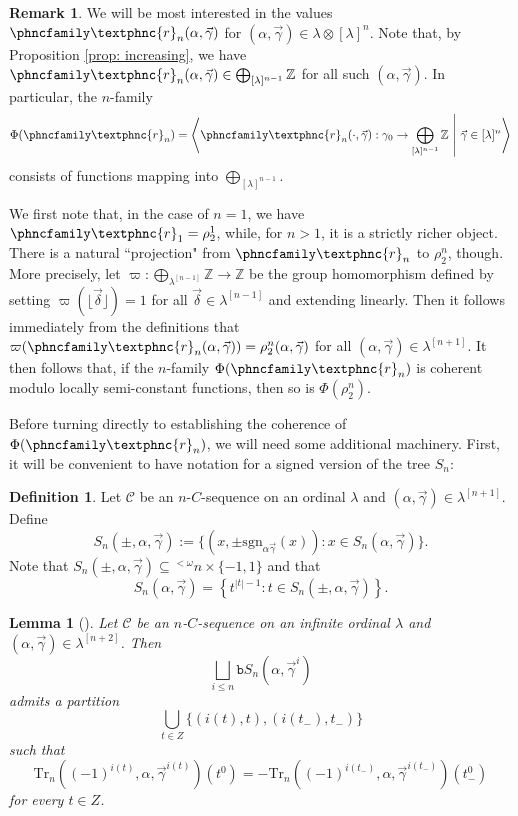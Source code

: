 \documentclass{amsart}
\numberwithin{theorem}{section}
\newtheorem{lemma}[theorem]{Lemma}
\theoremstyle{definition}
\newtheorem{definition}[theorem]{Definition}
\newtheorem{remark}[theorem]{Remark}
\renewcommand{\subset}{\subseteq}
\newcommand{\bb}{\mathbb}
\newcommand{\ra}{\rightarrow}
\newcommand{\Z}{\mathbb{Z}}
\newcommand{\w}{\omega}
\newcommand{\C}{\mathcal{C}}
\newcommand{\Tr}{\mathrm{Tr}}
\newcommand{\bS}{\mathtt{b}S}
\newcommand{\resh}{{\phncfamily\textphnc{r}}}
\newcommand{\sgn}{\mathrm{sgn}}
\begin{document}
\begin{remark}
  We will be most interested in the values $\resh_n(\alpha,\vec{\gamma})$ for 
  $(\alpha,\vec{\gamma}) \in \lambda \otimes [\lambda]^n$. Note that, by Proposition 
  \ref{prop: increasing}, we have $\resh_n(\alpha,\vec{\gamma}) \in \bigoplus_{[\lambda]^{n-1}} 
  \bb{Z}$ for all such $(\alpha,\vec{\gamma})$. In particular, the $n$-family
  \[
    \Phi(\resh_n) = \left\langle \resh_n(\cdot,\vec{\gamma}):\gamma_0 \ra 
    \bigoplus_{[\lambda]^{n-1}} \bb{Z} \ \middle| \ \vec{\gamma} \in [\lambda]^n
    \right\rangle
  \]
  consists of functions mapping into $\bigoplus_{[\lambda]^{n-1}}$.
\end{remark}

We first note that, in the case of $n = 1$, we have $\resh_1 = \rho_2^1$, while, for 
$n > 1$, it is a strictly richer object. There is a natural ``projection" from 
$\resh_n$ to $\rho_2^n$, though. More precisely, let 
$\varpi: \bigoplus_{\lambda^{[n-1]}} \Z \ra \Z$ be the group homomorphism defined by setting 
$\varpi(\lfloor \vec{\delta} \rfloor) = 1$
for all $\vec{\delta} \in \lambda^{[n-1]}$ and extending linearly. Then it follows immediately 
from the definitions that $\varpi(\resh_n(\alpha,\vec{\gamma})) = \rho_2^n(\alpha,\vec{\gamma})$ 
for all $(\alpha,\vec{\gamma}) \in \lambda^{[n+1]}$. It then follows that, if the $n$-family 
$\Phi(\resh_n)$ is coherent modulo locally semi-constant functions, then so is $\Phi(\rho_2^n)$.

Before turning directly to establishing the coherence of $\Phi(\resh_n)$, we will need some additional 
machinery. First, it will be convenient to have notation for a signed version of the tree $S_n$:
\begin{definition}\label{signS}
Let $\C$ be an $n$-$C$-sequence on an ordinal $\lambda$ and $(\alpha,\vec{\gamma}) \in 
\lambda^{[n+1]}$. Define
\[
S_n(\pm,\alpha,\vec\gamma):=\{(x,\pm\sgn_{\alpha\vec\gamma}(x)):x\in S_n(\alpha,\vec\gamma)\}.
\]
Note that $S_n(\pm,\alpha,\vec\gamma)\subset {}^{<\w}n \times \{-1,1\}$ and that
\[
S_n(\alpha,\vec\gamma)=\left\{t^{|t|-1}:t\in S_n(\pm,\alpha,\vec\gamma)\right\}.
\]
\end{definition}



\begin{lemma}[{\cite[Lemma 7.12]{bergfalk2024introductionhigherwalks}}]\label{7.12}
Let $\C$ be an $n$-$C$-sequence on an infinite ordinal $\lambda$ and $(\alpha,\vec{\gamma}) \in 
\lambda^{[n+2]}$. Then
\[
\bigsqcup_{i\le n}\bS_n(\alpha,\vec\gamma^i)
\]
admits a partition
\[
\bigcup_{t\in Z}\{(i(t),t),(i(t_-),t_-)\}
\]
such that
\[
\Tr_n((-1)^{i(t)},\alpha,\vec\gamma^{i(t)})(t^0)=-\Tr_n((-1)^{i(t_-)},\alpha,\vec\gamma^{i(t_-)})(t_-^0)
\]
for every $t\in Z$. 
\end{lemma}
\end{document}
